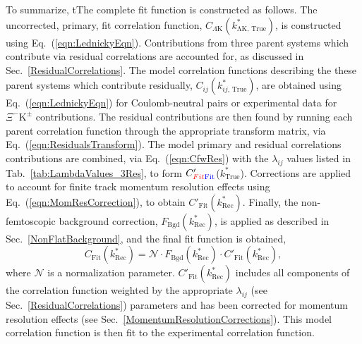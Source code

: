 \documentclass[ALICE,manyauthors]{cernphprep}
\newcommand{\ktrue}{$k^{*}_{\mathrm{True}}$\xspace}
\newcommand{\XiKpm}{$\Xi^{-}\mathrm{K^{\pm}}$\xspace}
\begin{document}
{\color{red}To summarize, t}{\color{blue}T}he complete fit function is constructed as follows.
The uncorrected, primary, {\color{blue}fit} correlation function, $C_{\Lambda\mathrm{K}}(k^{*}_{\mathrm{\Lambda K,\,True}})$, is constructed using Eq.~{\color{blue}(}\ref{eqn:LednickyEqn}{\color{blue})}.
{\color{blue}Contributions from three parent systems which contribute via residual correlations are accounted for, as discussed in Sec.~\ref{ResidualCorrelations}.}
The {\color{blue}model} correlation functions describing {\color{red}the} {\color{blue}these} parent systems {\color{red}which contribute residually}, $C_{ij}(k^{*}_{ij,\,\mathrm{True}})$, are obtained using Eq.~{\color{blue}(}\ref{eqn:LednickyEqn}{\color{blue})} for Coulomb-neutral pairs or experimental data for \XiKpm contributions.
The residual contributions are then found by running each parent correlation function through the appropriate transform matrix, via Eq.~{\color{blue}(}\ref{eqn:ResidualsTransform}{\color{blue})}.
The {\color{blue}model} primary and residual {\color{red}correlations} {\color{blue}contributions} are combined, via Eq.~{\color{blue}(}\ref{eqn:CfwRes}{\color{blue})} with {\color{blue}the $\lambda_{ij}$ values listed in} Tab.~\ref{tab:LambdaValues_3Res}, to form $C'_{{\color{red}Fit}{\color{blue}\mathrm{Fit}}}$(\ktrue).
Corrections are applied to account for {\color{blue}finite track} momentum resolution effects using Eq.~{\color{blue}(}\ref{eqn:MomResCorrection}{\color{blue})}, to obtain $C'_{\mathrm{Fit}}(k^{*}_{\mathrm{Rec}})$.
Finally, the non-femtoscopic background correction, $F_{\mathrm{Bgd}}(k^{*}_{\mathrm{Rec}})$, is applied {\color{blue}as described in Sec.~\ref{NonFlatBackground},} and the final fit function is obtained,
\begin{equation}
C_{\mathrm{Fit}}(k^{*}_{\mathrm{Rec}}) = \mathcal{N}\cdot F_{\mathrm{Bgd}}(k^{*}_{\mathrm{Rec}})\cdot C'_{\mathrm{Fit}}(k^{*}_{\mathrm{Rec}}),
\end{equation}
where $\mathcal{N}$ is a normalization parameter.
{\color{red}$C'_{\mathrm{Fit}}(k^{*}_{\mathrm{Rec}})$ includes all components of the correlation function weighted by the appropriate $\lambda_{ij}$ (see Sec.~\ref{ResidualCorrelations}) parameters and has been corrected for momentum resolution effects (see Sec.~\ref{MomentumResolutionCorrections}).}
{\color{blue}This model correlation function is then fit to the experimental correlation function.}

\end{document}
